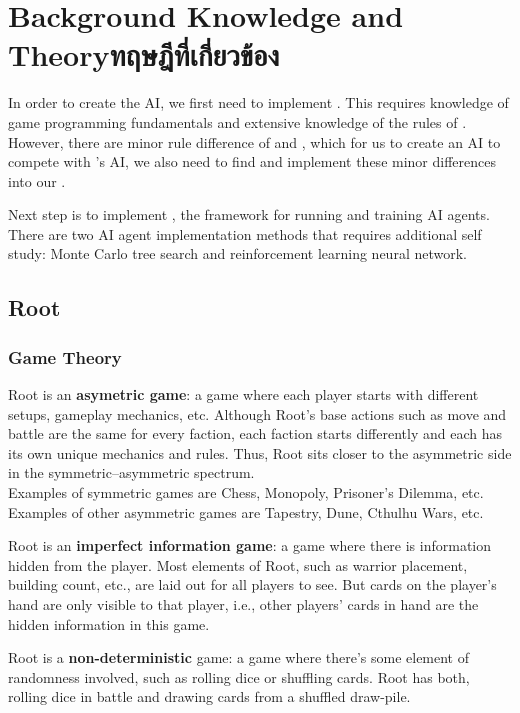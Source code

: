 \chapter{\ifenglish Background Knowledge and Theory\else ทฤษฎีที่เกี่ยวข้อง\fi}

In order to create the AI, we first need to implement \RootOurs{}. This requires knowledge of game programming fundamentals and extensive knowledge of the rules of \RootB{}. However, there are minor rule difference of \RootV{} and \RootB{}, which for us to create an AI to compete with \RootV{}'s AI, we also need to find and implement these minor differences into our \RootOurs{}.

Next step is to implement \RootAI{}, the framework for running \RootOurs{} and training AI agents. There are two AI agent implementation methods that requires additional self study: Monte Carlo tree search and reinforcement learning neural network.

\section{Root}
\subsection{Game Theory}
Root is an \textbf{asymetric game}: a game where each player starts with different setups, gameplay mechanics, etc. Although Root's base actions such as move and battle are the same for every faction, each faction starts differently and each has its own unique mechanics and rules. Thus, Root sits closer to the asymmetric side in the symmetric--asymmetric spectrum.\\
Examples of symmetric games are Chess, Monopoly, Prisoner's Dilemma, etc.\\
Examples of other asymmetric games are Tapestry, Dune, Cthulhu Wars, etc.

Root is an \textbf{imperfect information game}: a game where there is information hidden from the player. Most elements of Root, such as warrior placement, building count, etc., are laid out for all players to see. But cards on the player's hand are only visible to that player, i.e., other players' cards in hand are the hidden information in this game.

Root is a \textbf{non-deterministic} game: a game where there's some element of randomness involved, such as rolling dice or shuffling cards. Root has both, rolling dice in battle and drawing cards from a shuffled draw-pile.

